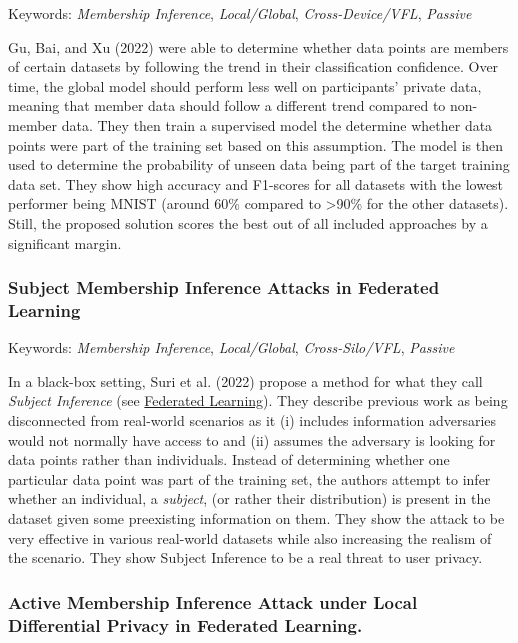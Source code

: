 \documentclass[
  compsoc]{IEEEtran}
\begin{document}
Keywords: \emph{Membership Inference}, \emph{Local/Global},
\emph{Cross-Device/VFL}, \emph{Passive}

Gu, Bai, and Xu (2022) were able to determine whether data points are
members of certain datasets by following the trend in their
classification confidence. Over time, the global model should perform
less well on participants' private data, meaning that member data should
follow a different trend compared to non-member data. They then train a
supervised model the determine whether data points were part of the
training set based on this assumption. The model is then used to
determine the probability of unseen data being part of the target
training data set. They show high accuracy and F1-scores for all
datasets with the lowest performer being MNIST (around 60\% compared to
\textgreater90\% for the other datasets). Still, the proposed solution
scores the best out of all included approaches by a significant margin.

\hypertarget{subject-membership-inference-attacks-in-federated-learning}{%
\subsubsection{Subject Membership Inference Attacks in Federated
Learning}\label{subject-membership-inference-attacks-in-federated-learning}}

Keywords: \emph{Membership Inference}, \emph{Local/Global},
\emph{Cross-Silo/VFL}, \emph{Passive}

In a black-box setting, Suri et al. (2022) propose a method for what
they call \emph{Subject Inference} (see
\protect\hyperlink{federated-learning}{Federated Learning}). They
describe previous work as being disconnected from real-world scenarios
as it (i) includes information adversaries would not normally have
access to and (ii) assumes the adversary is looking for data points
rather than individuals. Instead of determining whether one particular
data point was part of the training set, the authors attempt to infer
whether an individual, a \emph{subject}, (or rather their distribution)
is present in the dataset given some preexisting information on them.
They show the attack to be very effective in various real-world datasets
while also increasing the realism of the scenario. They show Subject
Inference to be a real threat to user privacy.

\hypertarget{active-membership-inference-attack-under-local-differential-privacy-in-federated-learning.}{%
\subsubsection{Active Membership Inference Attack under Local
Differential Privacy in Federated
Learning.}\label{active-membership-inference-attack-under-local-differential-privacy-in-federated-learning.}}
\end{document}
